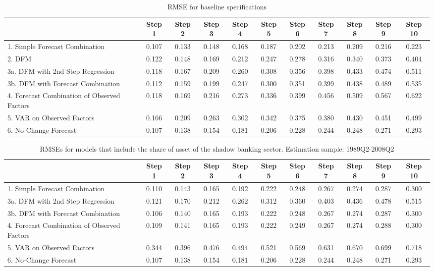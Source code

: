 \documentclass[11pt]{article}
\begin{document}
\newpage
{\normalsize \clearpage
\begin{table}
\center
\caption{RMSE for baseline specifications} \label{table_rmse_baseline}
\begin{tabular}{|l|c|c|c|c|c|c|c|c|c|c|}
\hline
&Step 1 &Step 2 &Step 3 &Step 4 &Step 5 &Step 6 &Step 7 &Step 8 &Step 9 &Step 10\\
\hline
1. Simple Forecast Combination             &0.107&0.133&0.148&0.168&0.187&0.202&0.213&0.209&0.216&0.223\\
2. DFM                                                       &0.122&0.148&0.169&0.212&0.247&0.278&0.316&0.340&0.373&0.404\\
3a. DFM with 2nd Step Regression           &0.118&0.167&0.209&0.260&0.308&0.356&0.398&0.433&0.474&0.511\\
3b. DFM with Forecast Combination          &0.112&0.159&0.199&0.247&0.300&0.351&0.399&0.438&0.489&0.535\\
4. Forecast Combination of Observed Factors&0.118&0.169&0.216&0.273&0.336&0.399&0.456&0.509&0.567&0.622\\
5. VAR on Observed Factors                 &0.166&0.209&0.263&0.302&0.342&0.375&0.380&0.430&0.451&0.499\\
6. No-Change Forecast                      &0.107&0.138&0.154&0.181&0.206&0.228&0.244&0.248&0.271&0.293\\
\hline
\end{tabular}
\end{table}
}


\newpage
{\normalsize \clearpage
\begin{table}
\caption{RMSEs for models that include the share of asset of the shadow banking sector. Estimation sample: 1989Q2-2008Q2} \label{table_rmse_competition}
\center
\begin{tabular}{|l|c|c|c|c|c|c|c|c|c|c|}
\hline
&Step 1 &Step 2 &Step 3 &Step 4 &Step 5 &Step 6 &Step 7 &Step 8 &Step 9 &Step 10\\
\hline
1. Simple Forecast Combination             &0.110&0.143&0.165&0.192&0.222&0.248&0.267&0.274&0.287&0.300\\
3a. DFM with 2nd Step Regression           &0.121&0.170&0.212&0.262&0.312&0.360&0.403&0.436&0.478&0.515\\
3b. DFM with Forecast Combination          &0.106&0.140&0.165&0.193&0.222&0.248&0.267&0.274&0.287&0.300\\
4. Forecast Combination of Observed Factors&0.109&0.141&0.165&0.193&0.222&0.249&0.267&0.274&0.288&0.300\\
5. VAR on Observed Factors                 &0.344&0.396&0.476&0.494&0.521&0.569&0.631&0.670&0.699&0.718\\
6. No-Change Forecast                      &0.107&0.138&0.154&0.181&0.206&0.228&0.244&0.248&0.271&0.293\\
\hline
\end{tabular}
\end{table}
}
\end{document}

